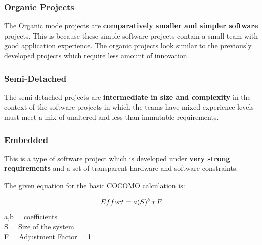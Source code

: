 \documentclass[a4paper, 11pt]{article}
\begin{document}
\subsubsection{Organic Projects}
The Organic mode projects are \textbf{comparatively smaller and simpler software} projects. This is because these simple software projects contain a small team with good application experience. The organic projects look similar to the previously developed projects which require less amount of innovation.\\ 

\subsubsection{Semi-Detached}
The semi-detached projects are \textbf{intermediate in size and complexity} in the context of the software projects in which the teams have mixed experience levels must meet a mix of unaltered and less than immutable requirements.\\

\subsubsection{Embedded}
This is a type of software project which is developed under \textbf{very strong requirements} and a set of transparent hardware and software constraints.

The given equation for the basic COCOMO calculation is:

\begin{equation*}
    Effort =  a(S)^{b} * F\\
\end{equation*}
a,b = coefficients\\
	S   = Size of the system\\
    F   = Adjustment Factor = 1\\ \\
\end{document}
